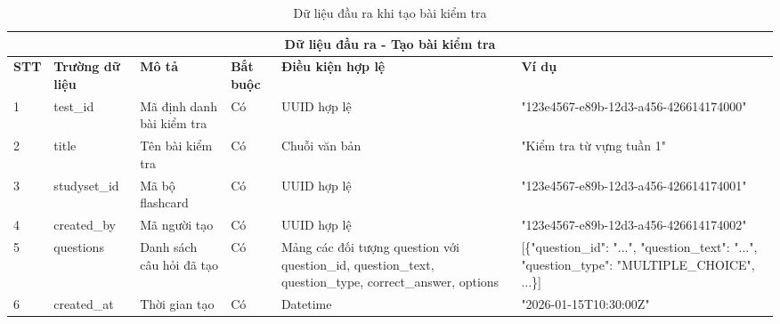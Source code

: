 \documentclass[../DoAn.tex]{subfiles}
\begin{document}
\vspace{0.5cm}

\begin{table}[h!]
\centering
\begin{tabular}{|m{1cm}|m{2.5cm}|m{3cm}|m{1cm}|m{2.5cm}|m{3.5cm}|}
    \hline
    \multicolumn{6}{|c|}{\textbf{Dữ liệu đầu ra - Tạo bài kiểm tra}} \\
    \hline
    \textbf{STT} & \textbf{Trường dữ liệu} & \textbf{Mô tả} & \textbf{Bắt buộc} & \textbf{Điều kiện hợp lệ} & \textbf{Ví dụ} \\
    \hline
    1 & test\_id & Mã định danh bài kiểm tra & Có & UUID hợp lệ & "123e4567-e89b-12d3-a456-426614174000" \\
    \hline
    2 & title & Tên bài kiểm tra & Có & Chuỗi văn bản & "Kiểm tra từ vựng tuần 1" \\
    \hline
    3 & studyset\_id & Mã bộ flashcard & Có & UUID hợp lệ & "123e4567-e89b-12d3-a456-426614174001" \\
    \hline
    4 & created\_by & Mã người tạo & Có & UUID hợp lệ & "123e4567-e89b-12d3-a456-426614174002" \\
    \hline
    5 & questions & Danh sách câu hỏi đã tạo & Có & Mảng các đối tượng question với question\_id, question\_text, question\_type, correct\_answer, options & [\{"question\_id": "...", "question\_text": "...", "question\_type": "MULTIPLE\_CHOICE", ...\}] \\
    \hline
    6 & created\_at & Thời gian tạo & Có & Datetime & "2026-01-15T10:30:00Z" \\
    \hline
\end{tabular}
\caption{Dữ liệu đầu ra khi tạo bài kiểm tra}
\end{table}

\vspace{0.5cm}
\end{document}
